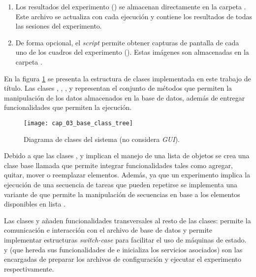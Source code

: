\documentclass[\main/Main.tex]{subfiles}
\begin{document}
\begin{enumerate}
				\item Los resultados del experimento () se almacenan directamente en la carpeta . Este archivo se actualiza con cada ejecución y contiene los resultados de todas las sesiones del experimento. 

				\item De forma opcional, el \textit{script} permite obtener capturas de pantalla de cada uno de los cuadros del experimento (). Estas imágenes son almacenadas en la carpeta . 
			\end{enumerate}

			En la figura \ref{fig:03_base_class_tree} se presenta la estructura de clases implementada en este trabajo de título. Las clases , , ,  y  representan el conjunto de métodos que permiten la manipulación de los datos almacenados en la base de datos, además de entregar funcionalidades que permiten la ejecución. 
			\begin{figure}[H]
				\centering
				\texttt{[image: cap\_03\_base\_class\_tree]}
				\caption{Diagrama de clases del sistema (no considera \textit{GUI}).}
				\label{fig:03_base_class_tree}
			\end{figure} 

			Debido a que las clases ,  y  implican el manejo de una lista de objetos se crea una clase base llamada  que permite integrar funcionalidades tales como agregar, quitar, mover o reemplazar elementos. Además, ya que un experimento implica la ejecución de una secuencia de tareas que pueden repetirse se implementa una variante de  que permite la manipulación de secuencias en base a los elementos disponibles en lista .

			Las clases  y  añaden funcionalidades transversales al resto de las clases:  permite la comunicación e interacción con el archivo de base de datos y  permite implementar estructuras \textit{switch-case} para facilitar el uso de máquinas de estado.  y  (que hereda sus funcionalidades de  e inicializa los servicios asociados) son las encargadas de preparar los archivos de configuración y ejecutar el experimento respectivamente.   
\end{document}
